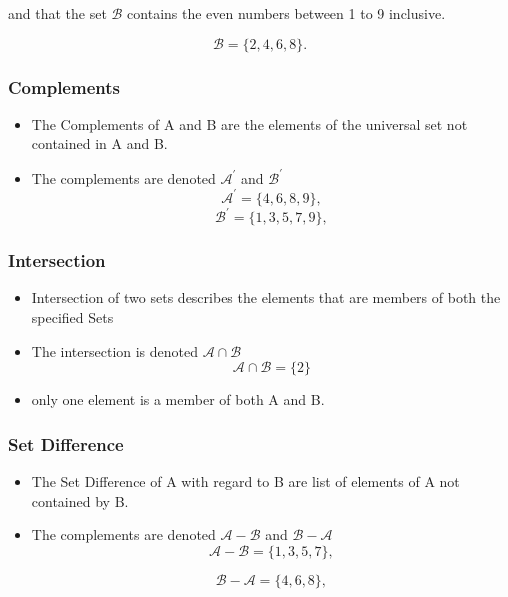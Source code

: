 \documentclass[]{report}
\begin{document}
and that the set $\mathcal{B}$ contains the even numbers between 1 to 9 inclusive.

\[ \mathcal{B} = \{2,4,6,8\}. \]

\subsubsection*{Complements}
\begin{itemize}

\item The Complements of A and B are the elements of the universal set not contained in A and B.

\item The complements are denoted $\mathcal{A}^{\prime}$ and $\mathcal{B}^{\prime}$
\[ \mathcal{A}^{\prime} = \{4,6,8,9\}, \]
\[ \mathcal{B}^{\prime} = \{1,3,5,7,9\}, \]

\end{itemize}



\subsubsection*{Intersection}
\begin{itemize}

\item Intersection of two sets describes the elements that are members of both the specified Sets

\item The intersection is denoted $\mathcal{A\cap B}$ 
\[ \mathcal{A\cap B} = \{2\}\]

\item only one element is a member of both A and B.
\end{itemize}

\subsubsection*{Set Difference}
\begin{itemize}

\item The Set Difference of A with regard to B are list of elements of A not contained by B.

\item The complements are denoted $\mathcal{A-B}$ and $\mathcal{B-A}$
\[ \mathcal{A-B} = \{1,3,5,7\}, \]

\[ \mathcal{B-A} = \{4,6,8\}, \]
\end{itemize}
\end{document}
